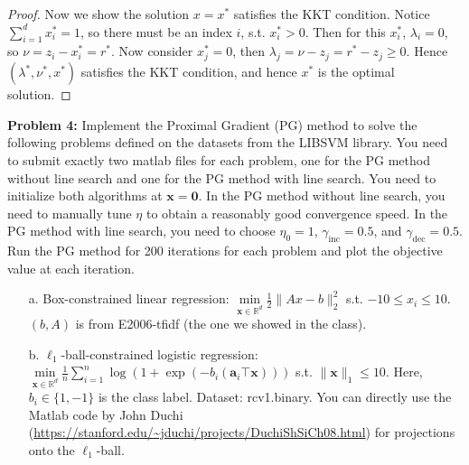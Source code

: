 \documentclass{article}
\newcommand{\bx}{{\mathbf x}}
\newcommand{\ba}{{\mathbf a}}
\begin{document}
\begin{enumerate}
\begin{proof}
Now we show the solution $x = x^* $ satisfies the KKT condition. Notice $\sum_{i=1}^{d}x_i^* = 1 $, so there must be an index $i$, s.t. $x_i^* > 0 $. Then for this $x_i^* $, $\lambda_i = 0 $, so $\nu = z_i - x_i^* = r^* $. Now consider $x_j^* = 0 $, then $\lambda_j = \nu - z_j = r^* - z_j \ge 0 $. Hence $(\lambda^*, \nu^*, x^*)$ satisfies the KKT condition, and hence $x^* $ is the optimal solution.

\end{proof}

\end{enumerate}
\bigskip

\noindent\textbf{Problem 4:} Implement the Proximal Gradient (PG) method to solve the following problems defined on the datasets from the LIBSVM library. You need to submit exactly two matlab files for each problem, one for the PG method without line search and one for the PG method with line search.
You need to initialize both algorithms at $\bx=\mathbf{0}$. In the PG method without line search, you need to manually tune $\eta$ to obtain a reasonably good convergence speed. In the PG method with line search, you need to choose $\eta_0=1$, $\gamma_{\text{inc}}=0.5$, and $\gamma_{\text{dec}}=0.5$. Run the PG method for 200 iterations for each problem and plot the objective value at each iteration. 
\begin{enumerate}
\item[a.] Box-constrained linear regression: $\min\limits_{\bx\in\mathbb{R}^d} \frac{1}{2}\|Ax-b\|_2^2$ s.t. $-10\leq x_i\leq 10$. $(b,A)$ is from E2006-tfidf (the one we showed in the class).
\item[b.] $\ell_1$-ball-constrained logistic regression: $\min\limits_{\bx\in\mathbb{R}^d} \frac{1}{n}\sum_{i=1}^n\log(1+\exp(-b_i(\ba_i\top\bx)))$ s.t. $\|\bx\|_1\leq 10$. Here, $b_i\in\{1,-1\}$ is the class label. Dataset: rcv1.binary. You can directly use the Matlab code by John Duchi (\url{https://stanford.edu/~jduchi/projects/DuchiShSiCh08.html}) for projections onto the $\ell_1$-ball. 
\end{enumerate}
\end{document}
